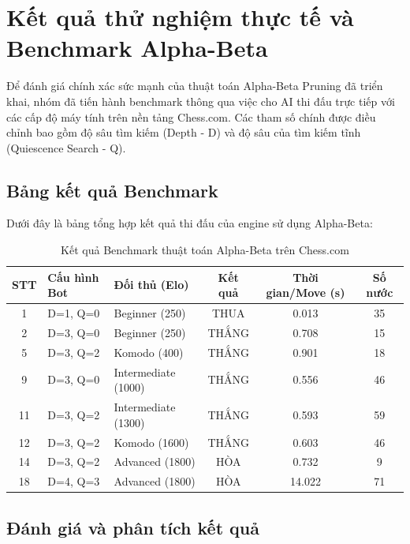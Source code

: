 \section{Kết quả thử nghiệm thực tế và Benchmark Alpha-Beta}

Để đánh giá chính xác sức mạnh của thuật toán Alpha-Beta Pruning đã triển khai, nhóm đã tiến hành benchmark thông qua việc cho AI thi đấu trực tiếp với các cấp độ máy tính trên nền tảng Chess.com. Các tham số chính được điều chỉnh bao gồm độ sâu tìm kiếm (Depth - D) và độ sâu của tìm kiếm tĩnh (Quiescence Search - Q).

\subsection{Bảng kết quả Benchmark}

Dưới đây là bảng tổng hợp kết quả thi đấu của engine sử dụng Alpha-Beta:

\begin{table}[H]
\centering
\caption{Kết quả Benchmark thuật toán Alpha-Beta trên Chess.com}
\label{tab:ab_benchmark}
\begin{tabularx}{\textwidth}{|c|l|X|c|c|c|}
\hline
\textbf{STT} & \textbf{Cấu hình Bot} & \centering \textbf{Đối thủ (Elo)} & \textbf{Kết quả} & \textbf{Thời gian/Move (s)} & \textbf{Số nước} \\ \hline
1  & D=1, Q=0 & Beginner (250)  & THUA & 0.013 & 35 \\ \hline
2  & D=3, Q=0 & Beginner (250)  & THẮNG & 0.708 & 15 \\ \hline
5  & D=3, Q=2 & Komodo (400)  & THẮNG & 0.901 & 18 \\ \hline
9  & D=3, Q=0 & Intermediate (1000) & THẮNG & 0.556 & 46 \\ \hline
11 & D=3, Q=2 & Intermediate (1300) & THẮNG & 0.593 & 59 \\ \hline
12 & D=3, Q=2 & Komodo (1600) & THẮNG & 0.603 & 46 \\ \hline
14 & D=3, Q=2 & Advanced (1800) & HÒA & 0.732 & 9 \\ \hline
18 & D=4, Q=3 & Advanced (1800) & HÒA & 14.022 & 71 \\ \hline
\end{tabularx}
\end{table}

\subsection{Đánh giá và phân tích kết quả}

